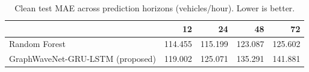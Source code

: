 \begin{table}
\caption{Clean test MAE across prediction horizons (vehicles/hour). Lower is better.}
\label{tab:clean_mae}
\begin{tabular}{lrrrr}
\toprule
 & 12 & 24 & 48 & 72 \\
\midrule
Random Forest & 114.455 & 115.199 & 123.087 & 125.602 \\
GraphWaveNet-GRU-LSTM (proposed) & 119.002 & 125.071 & 135.291 & 141.881 \\
\bottomrule
\end{tabular}
\end{table}
